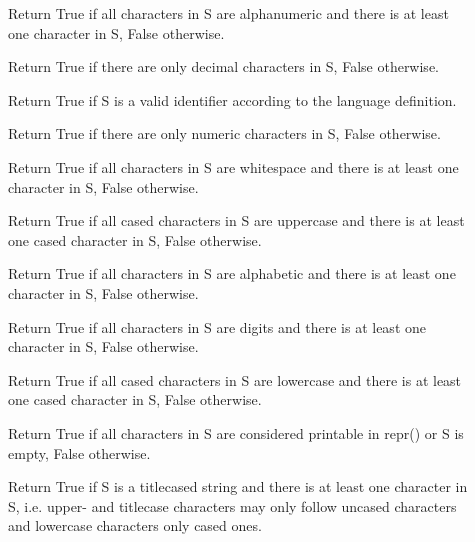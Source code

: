 \documentclass[11pt]{cselabheader}
\begin{document}
\begin{description}
\item[]  Return True if all characters in S are alphanumeric
  and there is at least one character in S, False otherwise.

\item[]  Return True if there are only decimal characters in S,
  False otherwise.

\item[]  Return True if S is a valid identifier according
  to the language definition.

\item[]  Return True if there are only numeric characters in S,
  False otherwise.

\item[]  Return True if all characters in S are whitespace
  and there is at least one character in S, False otherwise.

\item[]  Return True if all cased characters in S are uppercase and there is
  at least one cased character in S, False otherwise.

\item[]  Return True if all characters in S are alphabetic
  and there is at least one character in S, False otherwise.

\item[]  Return True if all characters in S are digits
  and there is at least one character in S, False otherwise.

\item[]  Return True if all cased characters in S are lowercase and there is
  at least one cased character in S, False otherwise.

\item[]  Return True if all characters in S are considered
  printable in repr() or S is empty, False otherwise.

\item[]  Return True if S is a titlecased string and there is at least one
  character in S, i.e. upper- and titlecase characters may only
  follow uncased characters and lowercase characters only cased ones.
\end{description}
\end{document}

